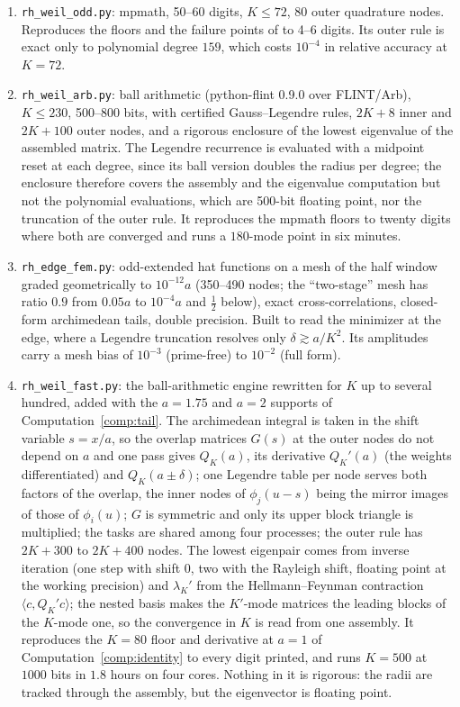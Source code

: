 \documentclass[11pt]{article}
\theoremstyle{definition}
\theoremstyle{remark}
\begin{document}
\begin{enumerate}[leftmargin=2em]
\item \texttt{rh\_weil\_odd.py}: mpmath, 50--60 digits, $K\le72$, $80$ outer quadrature nodes. Reproduces the floors and the failure points of \cite{michaels-folds} to 4--6 digits. Its outer rule is exact only to polynomial degree $159$, which costs $10^{-4}$ in relative accuracy at $K=72$.
\item \texttt{rh\_weil\_arb.py}: ball arithmetic (python-flint 0.9.0 over FLINT/Arb), $K\le230$, 500--800 bits, with certified Gauss--Legendre rules, $2K+8$ inner and $2K+100$ outer nodes, and a rigorous enclosure of the lowest eigenvalue of the assembled matrix. The Legendre recurrence is evaluated with a midpoint reset at each degree, since its ball version doubles the radius per degree; the enclosure therefore covers the assembly and the eigenvalue computation but not the polynomial evaluations, which are 500-bit floating point, nor the truncation of the outer rule. It reproduces the mpmath floors to twenty digits where both are converged and runs a $180$-mode point in six minutes.
\item \texttt{rh\_edge\_fem.py}: odd-extended hat functions on a mesh of the half window graded geometrically to $10^{-12}a$ (350--490 nodes; the ``two-stage'' mesh has ratio $0.9$ from $0.05a$ to $10^{-4}a$ and $\tfrac12$ below), exact cross-correlations, closed-form archimedean tails, double precision. Built to read the minimizer at the edge, where a Legendre truncation resolves only $\delta\gtrsim a/K^2$. Its amplitudes carry a mesh bias of $10^{-3}$ (prime-free) to $10^{-2}$ (full form).
\item \texttt{rh\_weil\_fast.py}: the ball-arithmetic engine rewritten for $K$ up to several hundred, added with the $a=1.75$ and $a=2$ supports of Computation~\ref{comp:tail}. The archimedean integral is taken in the shift variable $s=x/a$, so the overlap matrices $G(s)$ at the outer nodes do not depend on $a$ and one pass gives $Q_K(a)$, its derivative $Q_K'(a)$ (the weights differentiated) and $Q_K(a\pm\delta)$; one Legendre table per node serves both factors of the overlap, the inner nodes of $\phi_j(u-s)$ being the mirror images of those of $\phi_i(u)$; $G$ is symmetric and only its upper block triangle is multiplied; the tasks are shared among four processes; the outer rule has $2K+300$ to $2K+400$ nodes. The lowest eigenpair comes from inverse iteration (one step with shift $0$, two with the Rayleigh shift, floating point at the working precision) and $\lambda_K'$ from the Hellmann--Feynman contraction $\langle c,Q_K'c\rangle$; the nested basis makes the $K'$-mode matrices the leading blocks of the $K$-mode one, so the convergence in $K$ is read from one assembly. It reproduces the $K=80$ floor and derivative at $a=1$ of Computation~\ref{comp:identity} to every digit printed, and runs $K=500$ at $1000$ bits in $1.8$ hours on four cores. Nothing in it is rigorous: the radii are tracked through the assembly, but the eigenvector is floating point.
\end{enumerate}
\end{document}

